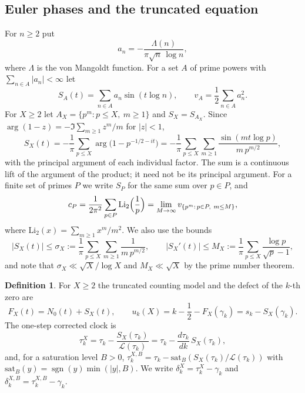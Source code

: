 \documentclass[11pt,reqno]{amsart}
\numberwithin{equation}{section}
\theoremstyle{plain}
\theoremstyle{definition}
\newtheorem{definition}[theorem]{Definition}
\theoremstyle{remark}
\newcommand{\NO}{N_0}
\newcommand{\lL}{\mathcal L}
\newcommand{\sgn}{\operatorname{sgn}}
\begin{document}
\subsection{Euler phases and the truncated equation}
\label{subsec:euler_phase}
For $n\ge2$ put
\begin{equation}
a_n=-\frac{\Lambda(n)}{\pi\sqrt n\,\log n},
\label{eq:an_def}
\end{equation}
where $\Lambda$ is the von Mangoldt function. For a set $A$ of prime powers with $\sum_{n\in A}|a_n|<\infty$ let
\begin{equation}
S_A(t)=\sum_{n\in A}a_n\sin(t\log n),\qquad v_A=\frac12\sum_{n\in A}a_n^2 .
\label{eq:SA_def}
\end{equation}
For $X\ge2$ let $A_X=\{p^m:p\le X,\ m\ge1\}$ and $S_X=S_{A_X}$. Since $\arg(1-z)=-\Im\sum_{m\ge1}z^m/m$ for $|z|<1$,
\begin{equation}
S_X(t)=-\frac1\pi\sum_{p\le X}\arg\bigl(1-p^{-1/2-it}\bigr)=-\frac1\pi\sum_{p\le X}\sum_{m\ge1}\frac{\sin(mt\log p)}{m\,p^{m/2}},
\label{eq:SX_def}
\end{equation}
with the principal argument of each individual factor. The sum is a continuous lift of the argument of the product; it need not be its principal argument. For a finite set of primes $P$ we write $S_P$ for the same sum over $p\in P$, and
\begin{equation}
c_P=\frac1{2\pi^2}\sum_{p\in P}\mathrm{Li}_2\Bigl(\frac1p\Bigr)=\lim_{M\to\infty}v_{\{p^m:\,p\in P,\ m\le M\}},
\label{eq:cP_def}
\end{equation}
where $\mathrm{Li}_2(x)=\sum_{m\ge1}x^m/m^2$. We also use the bounds
\begin{equation}
|S_X(t)|\le\sigma_X:=\frac1\pi\sum_{p\le X}\sum_{m\ge1}\frac1{m\,p^{m/2}},\qquad |S_X'(t)|\le M_X:=\frac1\pi\sum_{p\le X}\frac{\log p}{\sqrt p-1},
\label{eq:sigma_M_def}
\end{equation}
and note that $\sigma_X\ll\sqrt X/\log X$ and $M_X\ll\sqrt X$ by the prime number theorem.

\begin{definition}\label{def:LeClair_model}
For $X\ge2$ the truncated counting model and the defect of the $k$-th zero are
\begin{equation}
F_X(t)=\NO(t)+S_X(t),\qquad u_k(X)=k-\frac12-F_X(\gamma_k)=s_k-S_X(\gamma_k).
\label{eq:defect_def}
\end{equation}
The one-step corrected clock is
\begin{equation}
\tau_k^X=\tau_k-\frac{S_X(\tau_k)}{\lL(\tau_k)}=\tau_k-\frac{d\tau_k}{dk}\,S_X(\tau_k),
\label{eq:one_step_clock}
\end{equation}
and, for a saturation level $B>0$, $\tau_k^{X,B}=\tau_k-\mathrm{sat}_B(S_X(\tau_k)/\lL(\tau_k))$ with $\mathrm{sat}_B(y)=\sgn(y)\min(|y|,B)$. We write $\delta_k^X=\tau_k^X-\gamma_k$ and $\delta_k^{X,B}=\tau_k^{X,B}-\gamma_k$.
\end{definition}
\end{document}
